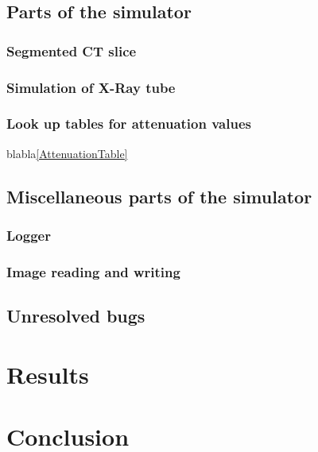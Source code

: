 \section{Parts of the simulator}
\subsection{Segmented CT slice}
\subsection{Simulation of X-Ray tube}
\subsection{Look up tables for attenuation values}
blabla\ref{AttenuationTable}
\section{Miscellaneous parts of the simulator}
\subsection{Logger}
\subsection{Image reading and writing}
\section{Unresolved bugs}

\chapter{Results}

\chapter{Conclusion}